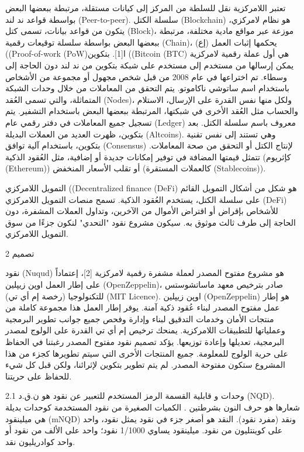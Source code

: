 تعتبر اللامركزية نقل للسلطة من المركز إلى كيانات مستقلة، مرتبطة ببعضها البعض بواسطة قواعد ند لند (Peer-to-peer). سلسلة الكتل (Blockchain) هو نظام لامركزي، يتكون من قواعد بيانات، تسمى كتل (Block)، موزعة عبر مواقع مادية مختلفة، مرتبطة ببعضها البعض بواسطة سلسلة توقيعات رقمية (Chain)، يحكمها إثبات العمل (إع) ((Proof-of-work (PoW)ا[1]. بتكوين ((Bitcoin (BTC) هي أول عملة رقمية لامركزية يمكن إرسالها من مستخدم إلى مستخدم على شبكة بتكوين من ند لند دون الحاجة إلى وسطاء. تم اختراعها في عام 2008 من قبل شخص مجهول أو مجموعة من الأشخاص باستخدام اسم ساتوشي ناكاموتو. يتم التحقق من المعاملات من خلال وحدات الشبكة المتماثلة، والتي تسمى العُقد (Nodes)، ولكل منها نفس القدرة على الإرسال، الاستلام والحساب مثل العُقد الأخرى في شبكتها، المرتبطة ببعضها البعض باستخدام التشفير. يتم تسجيل جميع المعاملات في دفتر رقمي عام (Ledger) معروف باسم سلسلة الكتل. بعد بتكوين، ظهرت العديد من العملات البديلة (Altcoins). وهي تستند إلى نفس تقنية بتكوين، باستخدام آلية توافق (Consensus) لإنتاج الكتل أو التحقق من صحة المعاملات. تتمثل قيمتها المضافة في توفير إمكانات جديدة أو إضافية، مثل العُقود الذكية (كإثريوم (Ethereum)) أو تقلب الأسعار المنخفض (كالعملات المستقرة (Stablecoins)).


التمويل اللامركزي ((Decentralized finance (DeFi) هو شكل من أشكال التمويل القائم على سلسلة الكتل، يستخدم العُقود الذكية. تسمح منصات التمويل اللامركزي (DeFi) للأشخاص بإقراض أو اقتراض الأموال من الآخرين، وتداول العملات المشفرة، دون الحاجة إلى طرف ثالث موثوق به. سيكون مشروع نقود "التحدي" لنكون جزءًا من سوق التمويل اللامركزي.


‫‪2‬‬  تصميم


نقود (Nuqud) هو مشروع مفتوح المصدر لعملة مشفرة رقمية لامركزية [2]، إعتماداً على إطار العمل اوپن زيپلين (OpenZeppelin)، صادر بترخيص معهد ماساتشوستس للتكنولوجيا (رخصة إم أي تي) (MIT Licence). اوپن زيپلين (OpenZeppelin) هو إطار عمل مفتوح المصدر لبناء عُقود ذكية آمنة. يوفر إطار العمل هذا مجموعة كاملة من منتجات الأمان وخدمات التدقيق لبناء وإدارة وفحص جميع جوانب تطوير البرمجية وعملياتها للتطبيقات اللامركزية. يمنحك ترخيص إم أي تي القدرة على الولوج لمصدر البرمجية، تعديلها وإعادة توزيعها. يؤكد تصميم نقود مفتوح المصدر رغبتنا في الحفاظ على حرية الولوج للمعلومة. جميع المنتجات الأخرى التي سيتم تطويرها كجزء من هذا المشروع ستكون مفتوحة المصدر. لم يتم تطوير بتكوين لإثرائنا، ولكن قبل كل شيء للحفاظ على حريتنا.


2.1  وحدات و قابلية القسمة
الرمز المستخدم للتعبير عن نقود هو ن.ق.د (NQD). شعارها هو حرف النون بشرطتين   . الكميات الصغيرة من نقود المستخدمة كوحدات بديلة هي ميلينقود (mNQD) ونقد (مفرد نقود). النقد هو أصغر جزء في نقود يمثل نقود، واحد على كوينتليون من نقود. ميلينقود يساوي 1/1000 نقود؛ واحد على الألف من نقود أو واحد كوادريليون نقد.


